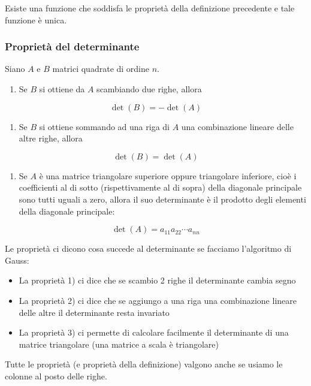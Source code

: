 \documentclass[
  a4paper,
]{article}
\providecommand{\tightlist}{%
  \setlength{\itemsep}{0pt}\setlength{\parskip}{0pt}}
\providecommand{\tightlist}{}
\begin{document}
\begin{propositionbox}
Esiste una funzione che soddisfa le proprietà della definizione
precedente e tale funzione è unica.
\end{propositionbox}

\hypertarget{proprietuxe0-del-determinante}{%
\subsubsection{Proprietà del
determinante}\label{proprietuxe0-del-determinante}}

\begin{propositionbox}
Siano \(A\) e \(B\) matrici quadrate di ordine \(n\).

\begin{enumerate}
\def\labelenumi{\arabic{enumi}.}
\tightlist
\item
  Se \(B\) si ottiene da \(A\) scambiando due righe, allora
\end{enumerate}

\[
\det(B) = -\det(A)
\]

\begin{enumerate}
\def\labelenumi{\arabic{enumi}.}
\setcounter{enumi}{1}
\tightlist
\item
  Se \(B\) si ottiene sommando ad una riga di \(A\) una combinazione
  lineare delle altre righe, allora
\end{enumerate}

\[
\det(B)=\det(A)
\]

\begin{enumerate}
\def\labelenumi{\arabic{enumi}.}
\setcounter{enumi}{2}
\tightlist
\item
  Se \(A\) è una matrice triangolare superiore oppure triangolare
  inferiore, cioè i coefficienti al di sotto (rispettivamente al di
  sopra) della diagonale principale sono tutti uguali a zero, allora il
  suo determinante è il prodotto degli elementi della diagonale
  principale:
\end{enumerate}

\[
\det(A)=a_{11}a_{22}\cdots a_{nn}
\]
\end{propositionbox}

\begin{observationbox}
Le proprietà ci dicono cosa succede al determinante se facciamo
l'algoritmo di Gauss:

\begin{itemize}
\tightlist
\item
  La proprietà 1) ci dice che se scambio 2 righe il determinante cambia
  segno
\item
  La proprietà 2) ci dice che se aggiungo a una riga una combinazione
  lineare delle altre il determinante resta invariato
\item
  La proprietà 3) ci permette di calcolare facilmente il determinante di
  una matrice triangolare (una matrice a scala è triangolare)
\end{itemize}

\bigskip

Tutte le proprietà (e proprietà della definizione) valgono anche se
usiamo le colonne al posto delle righe.
\end{observationbox}
\end{document}
